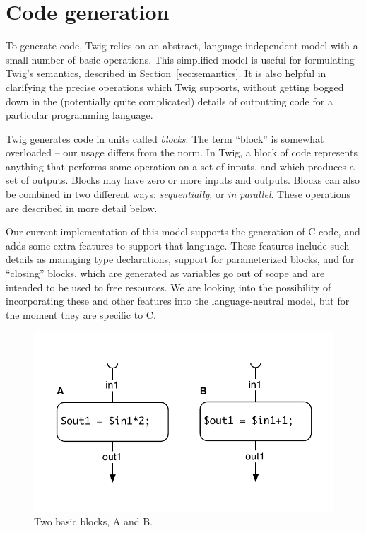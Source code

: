 
\section{Code generation}
\label{sec:code-gen}

To generate code, Twig relies on an abstract, language-independent model with a
small number of basic operations. This simplified model is useful for
formulating Twig's semantics, described in Section~\ref{sec:semantics}. It is
also helpful in clarifying the precise operations which Twig supports, without
getting bogged down in the (potentially quite complicated) details of outputting
code for a particular programming language.

Twig generates code in units called \emph{blocks}. The term ``block'' is
somewhat overloaded -- our usage differs from the norm. In Twig, a block of code
represents anything that performs some operation on a set of inputs, and which
produces a set of outputs. Blocks may have zero or more inputs and outputs.
Blocks can also be combined in two different ways: \emph{sequentially}, or
\emph{in parallel}. These operations are described in more detail below.

Our current implementation of this model supports the generation of C code, and
adds some extra features to support that language. These features include such
details as managing type declarations, support for parameterized blocks, and for
``closing'' blocks, which are generated as variables go out of scope and are
intended to be used to free resources. We are looking into the possibility of
incorporating these and other features into the language-neutral model, but for
the moment they are specific to C.

\begin{figure}[ht]
\centering
\includegraphics[width=0.75\columnwidth]{images/code-gen1}
\caption{Two basic blocks, A and B.}
\label{fig:codegen-blocks}
\end{figure}

